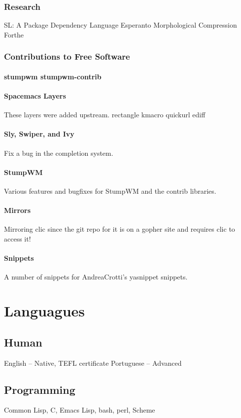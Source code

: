 \subsubsection{Research}
SL: A Package Dependency Language
Esperanto Morphological Compression
Forthe
\subsubsection{Contributions to Free Software}
\paragraph{stumpwm stumpwm-contrib}

\paragraph{Spacemacs Layers}
These layers were added upstream.
rectangle
kmacro
quickurl
ediff
\paragraph{Sly, Swiper, and Ivy}
Fix a bug in the completion system.
\paragraph{StumpWM}
Various features and bugfixes for StumpWM and the contrib libraries.
\paragraph{Mirrors}
Mirroring clic since the git repo for it is on a gopher site and requires clic to access it!
\paragraph{Snippets}
A number of snippets for AndreaCrotti's yasnippet snippets.



\section{Languagues}
\subsection{Human}
English -- Native, TEFL certificate
Portuguese -- Advanced
\subsection{Programming}
Common Lisp, C, Emacs Lisp, bash, perl, Scheme
